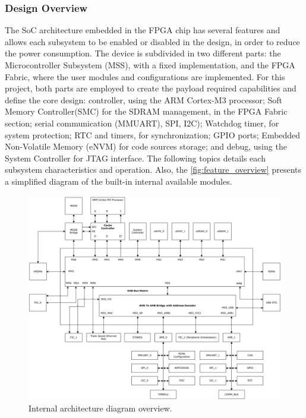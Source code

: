 
\subsubsection{Design Overview}

The SoC architecture embedded in the FPGA chip has several features and allows each subsystem to be enabled or disabled in the design, in order to reduce the power consumption. The device is subdivided in two different parts: the Microcontroller Subsystem (MSS), with a fixed implementation, and the FPGA Fabric, where the user modules and configurations are implemented. For this project, both parts are employed to create the payload required capabilities and define the core design: controller, using the ARM Cortex-M3 processor; Soft Memory Controller(SMC) for the SDRAM management, in the FPGA Fabric section; serial communication (MMUART), SPI, I2C); Watchdog timer, for system protection; RTC and timers, for synchronization; GPIO ports; Embedded Non-Volatile Memory (eNVM) for code sources storage; and debug, using the System Controller for JTAG interface. The following topics details each subsystem characteristics and operation. Also, the \autoref{fig:feature_overview} presents a simplified diagram of the built-in internal available modules.

\begin{figure}[!ht]
    \begin{center}
        \includegraphics[width=\textwidth]{figures/feature_overview.png}
        \caption{Internal architecture diagram overview.}
        \label{fig:feature_overview}
    \end{center}
\end{figure}

